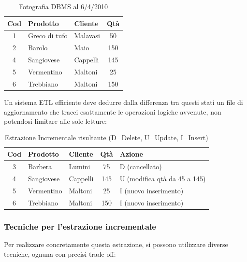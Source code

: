 \begin{table}[H]
    \centering
    \caption{Fotografia DBMS al 6/4/2010}
    \begin{tabular}{cllc}
    \toprule
    \textbf{Cod} & \textbf{Prodotto} & \textbf{Cliente} & \textbf{Qtà} \\
    \midrule
    1 & Greco di tufo & Malavasi & 50 \\
    2 & Barolo & Maio & 150 \\
    4 & Sangiovese & Cappelli & 145 \\
    5 & Vermentino & Maltoni & 25 \\
    6 & Trebbiano & Maltoni & 150 \\
    \bottomrule
    \end{tabular}
\end{table}

Un sistema ETL efficiente deve dedurre dalla differenza tra questi stati un file di aggiornamento che tracci esattamente le operazioni logiche avvenute, non potendosi limitare alle sole letture:

\begin{table}[H]
    \centering
    \caption{Estrazione Incrementale risultante (D=Delete, U=Update, I=Insert)}
    \begin{tabular}{cllcl}
    \toprule
    \textbf{Cod} & \textbf{Prodotto} & \textbf{Cliente} & \textbf{Qtà} & \textbf{Azione} \\
    \midrule
    3 & Barbera & Lumini & 75 & D (cancellato) \\
    4 & Sangiovese & Cappelli & 145 & U (modifica qtà da 45 a 145)\\
    5 & Vermentino & Maltoni & 25 & I (nuovo inserimento)\\
    6 & Trebbiano & Maltoni & 150 & I (nuovo inserimento)\\
    \bottomrule
    \end{tabular}
\end{table}

\subsubsection{Tecniche per l'estrazione incrementale}
Per realizzare concretamente questa estrazione, si possono utilizzare diverse tecniche, ognuna con precisi trade-off:

